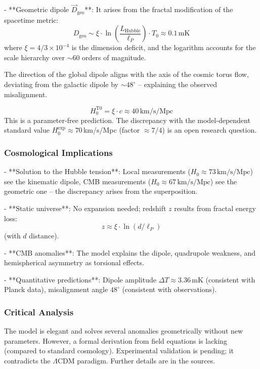 \documentclass[12pt,a4paper]{article}
\begin{document}
- **Geometric dipole $\vec{D}_{\text{geo}}$**:
It arises from the fractal modification of the spacetime metric:
\[
D_{\text{geo}} \sim \xi \cdot \ln\left(\frac{L_{\text{Hubble}}}{\ell_P}\right) \cdot T_0 \approx 0.1\,\text{mK}
\]
where $\xi = 4/3 \times 10^{-4}$ is the dimension deficit, and the logarithm accounts for the scale hierarchy over $\sim 60$ orders of magnitude.

The direction of the global dipole aligns with the axis of the cosmic torus flow, deviating from the galactic dipole by $\sim 48^\circ$ – explaining the observed misalignment.

\[
H_0^{\text{T0}} = \xi \cdot c \approx 40\,\text{km/s/Mpc}
\]
This is a parameter-free prediction. The discrepancy with the model-dependent standard value $H_0^{\text{exp}} \approx 70\,$km/s/Mpc (factor $\approx 7/4$) is an open research question.

\subsubsection{Cosmological Implications}

- **Solution to the Hubble tension**: Local measurements ($H_0 \approx 73\,\text{km/s/Mpc}$) see the kinematic dipole, CMB measurements ($H_0 \approx 67\,\text{km/s/Mpc}$) see the geometric one – the discrepancy arises from the superposition.

- **Static universe**: No expansion needed; redshift $z$ results from fractal energy loss:
\[
z \approx \xi \cdot \ln(d / \ell_P)
\]
(with $d$ distance).

- **CMB anomalies**: The model explains the dipole, quadrupole weakness, and hemispherical asymmetry as torsional effects.

- **Quantitative predictions**: Dipole amplitude $\Delta T \approx 3.36\,\text{mK}$ (consistent with Planck data), misalignment angle $48^\circ$ (consistent with observations).

\subsubsection{Critical Analysis}

The model is elegant and solves several anomalies geometrically without new parameters. However, a formal derivation from field equations is lacking (compared to standard cosmology). Experimental validation is pending; it contradicts the $\Lambda$CDM paradigm. Further details are in the sources.
\end{document}
